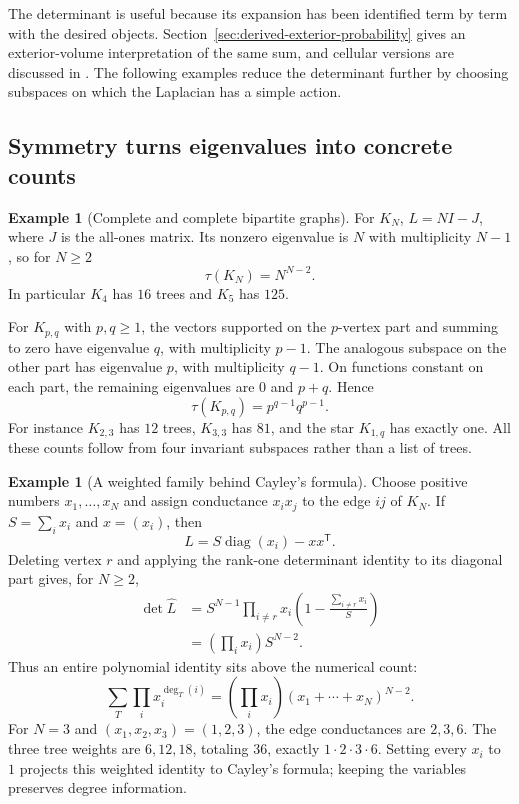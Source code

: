 \documentclass[11pt]{article}
\theoremstyle{definition}
\newtheorem{example}[theorem]{Example}
\theoremstyle{remark}
\begin{document}
The determinant is useful because its expansion has been identified term by term with the desired objects. Section~\ref{sec:derived-exterior-probability} gives an exterior-volume interpretation of the same sum, and cellular versions are discussed in \cite{glinDKM2016}. The following examples reduce the determinant further by choosing subspaces on which the Laplacian has a simple action.

\subsection{Symmetry turns eigenvalues into concrete counts}

\begin{example}[Complete and complete bipartite graphs]\label{ex:glin-complete}
For $K_N$, $L=NI-J$, where $J$ is the all-ones matrix. Its nonzero eigenvalue is $N$ with multiplicity $N-1$, so for $N\ge2$
\[
 \tau(K_N)=N^{N-2}.
\]
In particular $K_4$ has $16$ trees and $K_5$ has $125$.

For $K_{p,q}$ with $p,q\ge1$, the vectors supported on the $p$-vertex part and summing to zero have eigenvalue $q$, with multiplicity $p-1$. The analogous subspace on the other part has eigenvalue $p$, with multiplicity $q-1$. On functions constant on each part, the remaining eigenvalues are $0$ and $p+q$. Hence
\[
 \tau(K_{p,q})=p^{q-1}q^{p-1}.
\]
For instance $K_{2,3}$ has $12$ trees, $K_{3,3}$ has $81$, and the star $K_{1,q}$ has exactly one. All these counts follow from four invariant subspaces rather than a list of trees.
\end{example}

\begin{example}[A weighted family behind Cayley's formula]\label{ex:glin-weighted-cayley}
Choose positive numbers $x_1,\ldots,x_N$ and assign conductance $x_ix_j$ to the edge $ij$ of $K_N$. If $S=\sum_i x_i$ and $x=(x_i)$, then
\[
 L=S\operatorname{diag}(x_i)-xx^{\mathsf T}.
\]
Deleting vertex $r$ and applying the rank-one determinant identity to its diagonal part gives, for $N\ge2$,
\begin{align*}
 \det\widehat L
 &=S^{N-1}\prod_{i\ne r}x_i
 \left(1-\frac{\sum_{i\ne r}x_i}{S}\right)\\
 &=\left(\prod_i x_i\right)S^{N-2}.
\end{align*}
Thus an entire polynomial identity sits above the numerical count:
\[
 \sum_T\prod_i x_i^{\deg_T(i)}
 =\left(\prod_i x_i\right)(x_1+\cdots+x_N)^{N-2}.
\]
For $N=3$ and $(x_1,x_2,x_3)=(1,2,3)$, the edge conductances are $2,3,6$. The three tree weights are $6,12,18$, totaling $36$, exactly $1\cdot2\cdot3\cdot6$. Setting every $x_i$ to $1$ projects this weighted identity to Cayley's formula; keeping the variables preserves degree information.
\end{example}
\end{document}
